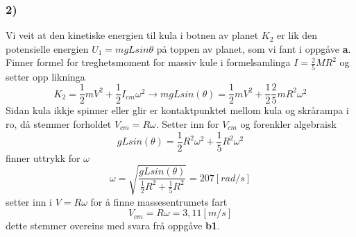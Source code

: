 \documentclass[12pt,a4paper]{article}
\begin{document}
    \subsubsection*{2)}
    Vi veit at den kinetiske energien til kula i botnen av planet $K_2$ er lik
    den potensielle energien $U_1=mgLsin\theta$ på toppen av planet, som vi fant i oppgåve
    \textbf{a}. Finner formel for treghetsmoment for massiv kule i
    formelsamlinga $I = \frac{2}{5}MR^2$ og setter opp likninga
    \begin{equation}
      K_2 = \frac{1}{2}mV^2 + \frac{1}{2}I_{cm}\omega^2 \longrightarrow
      mgLsin(\theta) = \frac{1}{2}mV^2 + \frac{1}{2}\frac{2}{5}mR^2 \omega^2
    \end{equation}
    Sidan kula ikkje spinner eller glir er kontaktpunktet mellom kula og skrårampa
    i ro, då stemmer forholdet $V_{cm} = R\omega$. Setter inn for $V_{cm}$ og
    forenkler algebraisk
    \begin{equation}
      gLsin(\theta) = \frac{1}{2}R^2\omega^2 + \frac{1}{5}R^2\omega^2
    \end{equation}
    finner uttrykk for $\omega$
    \begin{equation}
      \omega = \sqrt{\frac{gLsin(\theta)}{\frac{1}{2}R^2+\frac{1}{5}R^2}} = 207 [rad/s]
    \end{equation}
    setter inn i $V = R\omega$ for å finne massesentrumets fart
    \begin{equation}
      V_{cm} = R\omega = 3,11 [m/s]
    \end{equation}
    dette stemmer overeins med svara frå oppgåve \textbf{b1}.

    \newpage
    
\end{document}
